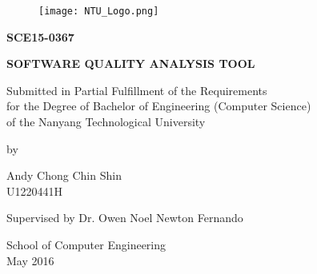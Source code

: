 \thispagestyle{empty}

\begin{center}

\begin{figure}[h]
    \centering
    \texttt{[image: NTU\_Logo.png]}
\end{figure}

\vspace{2.0cm}

\textbf{\Large \MakeUppercase{SCE15-0367}} \\

\vspace{0.5cm}

\textbf{\Large \MakeUppercase{Software Quality Analysis Tool}}

\vspace{3.0cm}

Submitted in Partial Fulfillment of the Requirements \\
for the Degree of Bachelor of Engineering (Computer Science) \\
of the Nanyang Technological University

\vspace{0.5cm}

by

\vspace{0.5cm}

Andy Chong Chin Shin \\
U1220441H

\vspace{\fill}

Supervised by Dr. Owen Noel Newton Fernando

\vspace{\fill}

School of Computer Engineering \\
May 2016

\vspace{\fill}

\end{center}
